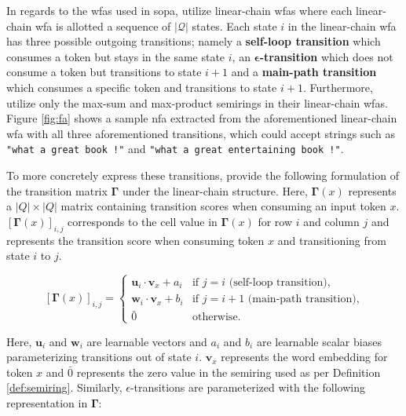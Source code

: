 In regards to the \ac{wfas} used in \ac{sopa}, \citet{schwartz2018sopa} utilize
linear-chain \ac{wfas} where each linear-chain \ac{wfa} is allotted a sequence of
$|\mathcal{Q}|$ states. Each state $i$ in the linear-chain \ac{wfa} has three
possible outgoing transitions; namely a \textbf{self-loop transition} which
consumes a token but stays in the same state $i$, an
\textbf{$\bm{\epsilon}$-transition} which does not consume a token but transitions to
state $i+1$ and a \textbf{main-path transition} which consumes a specific token
and transitions to state $i+1$. Furthermore, \citet{schwartz2018sopa} utilize
only the max-sum and max-product semirings in their linear-chain \ac{wfas}. Figure
\ref{fig:fa} shows a sample \ac{nfa} extracted from the aforementioned linear-chain
\ac{wfa} with all three aforementioned transitions, which could accept
strings such as \texttt{"what a great book !"} and \texttt{"what a great
  entertaining book !"}.

To more concretely express these transitions, \citet{schwartz2018sopa} provide
the following formulation of the transition matrix $\bm{\Gamma}$ under the
linear-chain structure. Here, $\bm{\Gamma}(x)$ represents a $|Q|\times|Q|$ matrix
containing transition scores when consuming an input token $x$. $[\bm{\Gamma}(x)]_{i,j}$
corresponds to the cell value in $\bm{\Gamma}(x)$ for row $i$ and column
$j$ and represents the transition score when consuming token $x$ and
transitioning from state $i$ to $j$.

\begin{equation}
  \label{eq:sopa_transition_matrix_main}
  [\bm{\Gamma}(x)]_{i,j} =
  \begin{cases}
    \bm{u}_i \cdot \bm{v}_x + a_i  & \text{if } j = i \text{ (self-loop transition),} \\
    \bm{w}_i \cdot \bm{v}_x + b_i  & \text{if } j = i + 1 \text{ (main-path transition),} \\
    \bar{0} & \text{otherwise.}
  \end{cases}
\end{equation}

Here, $\bm{u}_i$ and $\bm{w}_i$ are learnable vectors and $a_i$ and $b_i$ are
learnable scalar biases parameterizing transitions out of state $i$. $\bm{v}_x$
represents the word embedding for token $x$ and $\bar{0}$ represents the zero
value in the semiring used as per Definition \ref{def:semiring}. Similarly,
$\epsilon$-transitions are parameterized with the following representation in
$\bm{\Gamma}$:


